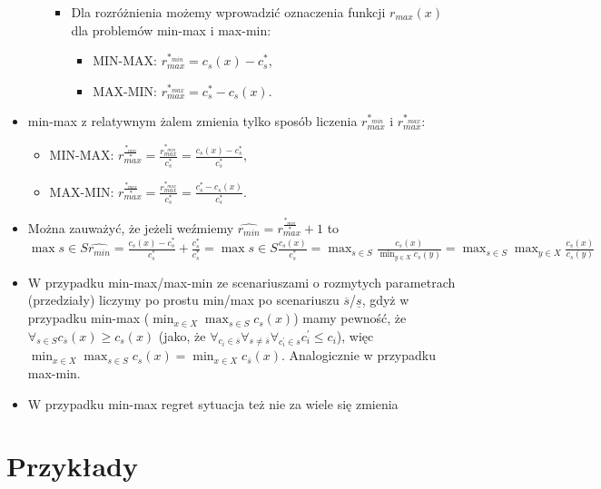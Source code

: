 \begin{itemize}
\begin{itemize}
\begin{itemize}
			\item Dla rozróżnienia możemy wprowadzić oznaczenia funkcji $r_{max}(x)$ dla problemów min-max i max-min:
			\begin{itemize}
				\item \textsc{MIN-MAX}: $r_{max}^{\ast_{min}} = c_s(x) - c_s^\ast$,
				\item \textsc{MAX-MIN}: $r_{max}^{\ast_{max}} = c_s^\ast - c_s(x)$.
			\end{itemize}
		\end{itemize}
	\end{itemize}
	\item min-max z relatywnym żalem zmienia tylko sposób liczenia $r_{max}^{\ast_{min}}$ i $r_{max}^{\ast_{max}}$:
	\begin{itemize}
		\item \textsc{MIN-MAX}: $r_{max}^{\frac{\ast_{min}}{\ast}} = \frac{r_{max}^{\ast_{min}}}{c_s^\ast} = \frac{c_s(x) - c_s^\ast}{c_s^\ast}$,
		\item \textsc{MAX-MIN}: $r_{max}^{\frac{\ast_{max}}{\ast}} = \frac{r_{max}^{\ast_{max}}}{c_s^\ast} = \frac{c_s^\ast - c_s(x)}{c_s^\ast}$.
	\end{itemize}
	\item Można zauważyć, że jeżeli weźmiemy $\hat{r_{min}} = r_{max}^{\frac{\ast_{min}}{\ast}} + 1$ to $\max{s \in S} \hat{r_{min}} = \frac{c_s(x) - c_s^\ast}{c_s^\ast} + \frac{c_s^\ast}{c_s^\ast} = \max{s \in S} \frac{c_s(x)}{c_s^\ast} = \max_{s \in S} \frac{c_s(x)}{\min_{y \in X} c_s(y)} = \max_{s \in S} \max_{y \in X} \frac{c_s(x)}{c_s(y)}$
	\item W przypadku min-max/max-min ze scenariuszami o rozmytych parametrach (przedziały) liczymy po prostu min/max po scenariuszu $\overline{s}$/$\underline{s}$, gdyż w przypadku min-max ($\min_{x \in X} \max_{s \in S} c_s(x)$) mamy pewność, że $\forall_{s \in S} c_{\overline{s}}(x) \geqslant c_s(x)$ (jako, że $\forall_{c_i \in \overline{s}} \forall_{s \neq \overline{s}} \forall_{c^\prime_i \in s} c^\prime_i \leqslant c_i$), więc $\min_{x \in X} \max_{s \in S} c_s(x) = \min_{x \in X} c_{\overline{s}}(x)$. Analogicznie w przypadku max-min.
	\item W przypadku min-max regret sytuacja też nie za wiele się zmienia
\end{itemize}



\section{Przykłady}

